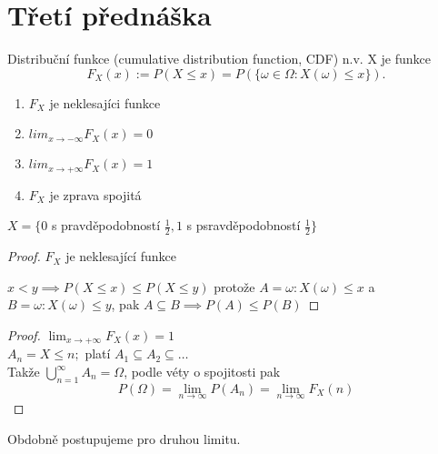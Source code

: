 \documentclass[../main.tex]{subfiles}
\begin{document}
\section{Třetí přednáška}

\begin{definition}
    Distribuční funkce (cumulative distribution function, CDF) n.v. X
    je funkce
    \[F_X(x) := P(X\leq x) = P(\{\omega \in \Omega : X(\omega) \leq x\}).\]
    \begin{enumerate}
        \item $F_X$ je neklesajíci funkce
        \item $lim_{x \rightarrow -\infty} F_X(x) = 0$
        \item $lim_{x \rightarrow +\infty} F_X(x) = 1$
        \item $F_X$ je zprava spojitá
    \end{enumerate}
\end{definition}

\begin{example}
    $X = \{0$ s pravděpodobností $\frac{1}{2}, 1$ s psravděpodobností $\frac{1}{2}\}$
\end{example}
\begin{proof}
    $F_X$ je neklesající funkce

    \noindent
    $x<y \implies P(X\leq x) \leq P(X\leq y)$ protože $A = {\omega : X(\omega) \leq x}$ a\\
    $B = {\omega : X(\omega) \leq y}$, pak $A\subseteq B \implies P(A) \leq P(B)$
\end{proof}

\begin{proof}
    $\lim_{x\rightarrow +\infty} F_X(x) = 1$\\
    $A_n = {X\leq n};$ platí $A_1 \subseteq A_2 \subseteq \dots$\\
    Takže $\bigcup^\infty_{n=1} A_n = \Omega$, podle véty o spojitosti pak\\
    \[P(\Omega) = \lim_{n\rightarrow \infty} P(A_n) = \lim_{n\rightarrow \infty} F_X(n)\]
\end{proof}

Obdobně postupujeme pro druhou limitu.
\end{document}
